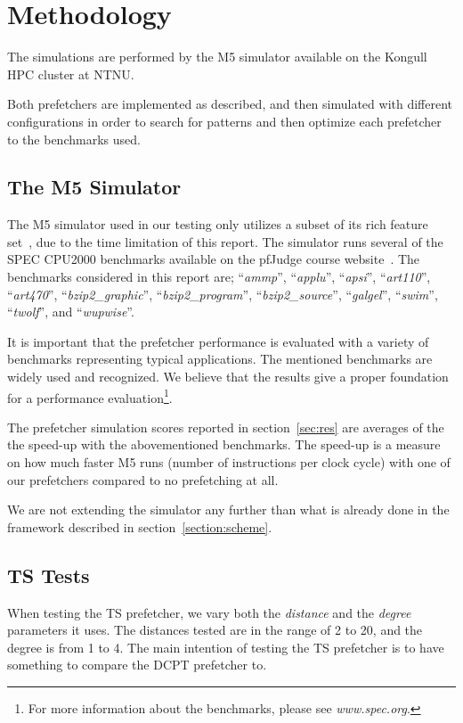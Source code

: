 \section{Methodology}

The simulations are performed by the
M5 simulator available on the Kongull HPC cluster at NTNU.

Both prefetchers are implemented as described, and then simulated with different
configurations in order to search for patterns and then optimize each prefetcher
to the benchmarks used.

\subsection{The M5 Simulator}

The M5 simulator used in our testing only utilizes a subset of its rich feature
set~\cite{user_doc}, due to the time limitation of this report. The simulator
runs several of the SPEC CPU2000 benchmarks available on the pfJudge course
website~\cite{guidelines}. The benchmarks considered in this report are;
``\emph{ammp}'', ``\emph{applu}'', ``\emph{apsi}'', ``\emph{art110}'',
``\emph{art470}'', ``\emph{bzip2\_graphic}'', ``\emph{bzip2\_program}'',
``\emph{bzip2\_source}'', ``\emph{galgel}'', ``\emph{swim}'', ``\emph{twolf}'',
and ``\emph{wupwise}''.

It is important that the prefetcher performance is evaluated with a variety of
benchmarks representing typical applications. The mentioned benchmarks are
widely used and recognized. We believe that the results give a proper
foundation for a performance evaluation\footnote{For more information about the
benchmarks, please see \emph{www.spec.org}.}.

The prefetcher simulation scores reported in section~\ref{sec:res} are averages of the
the speed-up with the abovementioned benchmarks. The speed-up is a measure on
how much faster M5 runs (number of instructions per clock cycle) with one of our
prefetchers compared to no prefetching at all.

We are not extending the simulator any further than what is already done in the
framework described in section~\ref{section:scheme}.

\subsection{TS Tests}

When testing the TS prefetcher, we vary both the \emph{distance} and the
\emph{degree} parameters it uses. The distances tested are in the range of 2 to
20, and the degree is from 1 to 4. The main intention of testing the TS prefetcher
is to have something to compare
the DCPT prefetcher to.

